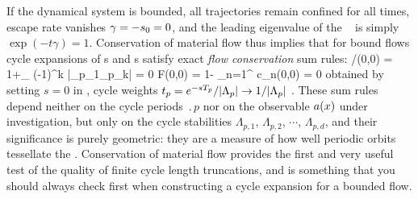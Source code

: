 


If the dynamical system is bounded, all trajectories remain confined for
all times, escape rate  vanishes $\gamma=-s_0=0$, and the
leading eigenvalue
of the \FPoper\  is simply
$\exp(-t\gamma)=1$.
Conservation of material flow thus implies that for bound flows
cycle expansions  of \dzeta s and \Fd s satisfy
exact {\em flow conservation} sum rules:
/\zeta(0,0) = 1+\sumprime_\pseudos
		{ (-1)^k \over
		|\Lambda_{p_1}\cdots \Lambda_{p_k}|} = 0
	\label{prob-cons-zeta}
\eeq
\beq
	F(0,0) = 1- \sum_{n=1}^{\infty} c_{n}(0,0) = 0
\label{prob-cons-F}
\eeq
obtained by setting $s=0$ in , 
cycle weights
$t_p  = e^{- s {T_{p}}} /|\Lambda_p|
\to {1 / |\ensuremath{\Lambda}_p|}$ .
These sum rules depend neither
on the cycle periods $\period{p}$
nor on the observable $a(x)$ under investigation,
but only on the cycle stabilities $\Lambda_{p,1}$, $\Lambda_{p,2}$,
$\cdots$, $\Lambda_{p,d}$,
and their significance is purely geometric: they are a measure
of how well periodic orbits tessellate the {\statesp}.
Conservation of material flow
provides the first and very useful test of the quality of
finite cycle length truncations, and is something that
you should always check first when constructing a cycle
expansion for a bounded flow. 
